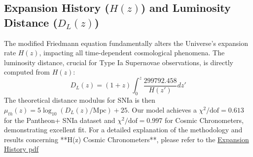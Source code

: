 \documentclass[aps,prl,twocolumn,groupedaddress]{revtex4-2}
\newcommand{\cval}{299792.458}
\begin{document}
\subsection{Expansion History ($H(z)$) and Luminosity Distance ($D_L(z)$)}
The modified Friedmann equation fundamentally alters the Universe's expansion rate $H(z)$, impacting all time-dependent cosmological phenomena. The luminosity distance, crucial for Type Ia Supernovae observations, is directly computed from $H(z)$:
$$
D_L(z) = (1+z) \int_0^z \frac{\cval}{H(z')} dz'
$$
The theoretical distance modulus for SNIa is then $\mu_{th}(z) = 5 \log_{10}(D_L(z) / \text{Mpc}) + 25$. Our model achieves a $\chi^2/\text{dof} = 0.613$ for the Pantheon+ SNIa dataset and $\chi^2/\text{dof} = 0.997$ for Cosmic Chronometers, demonstrating excellent fit.
For a detailed explanation of the methodology and results concerning **H(z) Cosmic Chronometers**, please refer to the \href{methods/Expansion_History.pdf}{Expansion History pdf}
\end{document}
